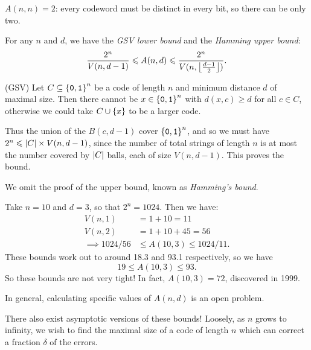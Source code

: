 \documentclass{article}
\begin{document}
\begin{corollary}
    $A(n, n) = 2$: every codeword must be distinct in every bit,
    so there can be only two.
\end{corollary}

\begin{proposition}
    For any $n$ and $d$,
    we have the \textit{GSV lower bound}
    and the \textit{Hamming upper bound}:
    \[
	\frac{2^n}{V(n, d-1)}
	\leqslant A(n, d) \leqslant
	\frac{2^n}{V(n, \left\lfloor\frac{d-1}{2}\right\rfloor)}.
	\]
\end{proposition}
\begin{prf}
    (GSV) Let $C \subseteq \left\lbrace \texttt{0}, \texttt{1} \right\rbrace^n$ be a code of length $n$ and minimum distance $d$
    of maximal size.
    Then there cannot be $x \in \left\lbrace \texttt{0}, \texttt{1} \right\rbrace^n$
    with $d(x, c) \geq d$ for all $c \in C$,
    otherwise we could take $C \cup \left\lbrace x \right\rbrace$ to be a larger code.
    
    Thus the union of the $B(c, d-1)$ cover $\left\lbrace \texttt{0}, \texttt{1} \right\rbrace^n$,
    and so we must have $2^n \leqslant \left\lvert C \right\rvert \times V(n, d-1)$,
    since the number of total strings of length $n$ is
    at most the number covered by $\left\lvert C \right\rvert$ balls,
    each of size $V(n, d-1)$. This proves the bound.
\end{prf}

\begin{note}
	We omit the proof of the upper bound, known as \textit{Hamming's bound}.
\end{note}

\begin{example}
    Take $n=10$ and $d=3$, so that $2^n = 1024$. Then we have:
    \begin{align*}
    	V(n, 1) &= 1 + 10 = 11 \\
    	V(n, 2) &= 1 + 10 + 45 = 56 \\
    	\implies 1024/56 &\leq A(10, 3) \leq 1024/11.
	\end{align*}
	These bounds work out to around 18.3 and 93.1 respectively, so we have
	\[
	19 \leq A(10, 3) \leq 93.
	\]
	So these bounds are not very tight!
	In fact, $A(10, 3) = 72$, discovered in 1999.
\end{example}

\begin{note}
	In general, calculating specific values of $A(n, d)$ is an open problem.
\end{note}

There also exist asymptotic versions of these bounds!
Loosely, as $n$ grows to infinity,
we wish to find the maximal size of a code of length $n$
which can correct a fraction $\delta$ of the errors.
\end{document}
